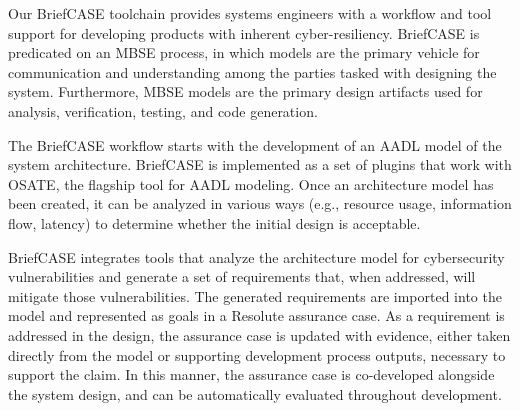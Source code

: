 

Our BriefCASE toolchain provides systems engineers with a workflow and tool support for developing products with inherent cyber-resiliency.
BriefCASE is predicated on an MBSE process, in which models are the primary vehicle for communication and understanding among the parties tasked with designing the system. Furthermore, MBSE models are the primary design artifacts used for analysis, verification, testing, and code generation.  

The BriefCASE workflow starts with the development of an AADL model of the system architecture. 
BriefCASE is implemented as a set of plugins that work with OSATE, the flagship tool for AADL modeling.
Once an architecture model has been created, it can be analyzed in various ways  (e.g., resource usage, information flow, latency) to determine whether the initial design is acceptable. 

BriefCASE integrates tools that analyze the architecture model for cybersecurity vulnerabilities and generate a set of requirements that, when addressed, will mitigate those vulnerabilities.  
The generated requirements are imported into the model and represented as goals in a Resolute assurance case.  As a requirement is addressed in the design, the assurance case is updated with evidence, either taken directly from the model or supporting development process outputs, necessary to support the claim.  In this manner, the assurance case is co-developed alongside the system design, and can be automatically evaluated throughout development.